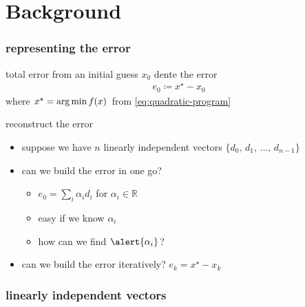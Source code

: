 \documentclass[10pt,dvipsnames*]{beamer}
\begin{document}
\section{Background}%
\label{sec:backgrond}
%
\begin{frame}
  \frametitle{representing the error}
  \pause
  \begin{block}{total error}
    from an initial guess $x_0$ dente the error
    \begin{align}
      \label{eq:error-0}
      e_0 \coloneqq x^{\star} - x_0
    \end{align}
    where $x^{\star} = \operatorname*{arg\,min} f(x)$ from \cref{eq:quadratic-program}
  \end{block}
  \pause
  \begin{block}{reconstruct the error}
    \begin{itemize}
      \item suppose we have $n$ linearly independent vectors $\{d_0,\, d_1,\, \ldots,\, d_{n-1} \}$
      \item can we build the error in one go?
      \begin{itemize}
        \item $e_0 = \sum_i \alpha_i d_i$ for $\alpha_i \in \mathbb{R}$
        \item easy if we know $\alpha_i$
        \item \alert{how can we find} $\alert{\alpha_i}$?
      \end{itemize}
      \item can we build the error iteratively? $e_k = x^{\star} - x_k$
    \end{itemize}
  \end{block}
\end{frame}
%
\begin{frame}
  \frametitle{linearly independent vectors}
  \centering {}
\end{frame}
\end{document}

